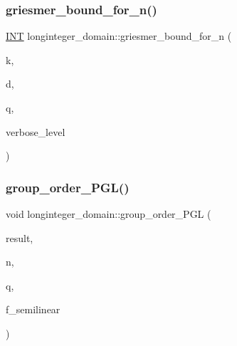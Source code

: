 \mbox{\label{classlonginteger__domain_af4d670e98c803dbce5433484af0e7b7d}} 
\subsubsection{\texorpdfstring{griesmer\+\_\+bound\+\_\+for\+\_\+n()}{griesmer\_bound\_for\_n()}}
{\footnotesize\ttfamily \mbox{\hyperlink{galois_8h_a09fddde158a3a20bd2dcadb609de11dc}{I\+NT}} longinteger\+\_\+domain\+::griesmer\+\_\+bound\+\_\+for\+\_\+n (\begin{DoxyParamCaption}\item[{\mbox{\hyperlink{galois_8h_a09fddde158a3a20bd2dcadb609de11dc}{I\+NT}}}]{k,  }\item[{\mbox{\hyperlink{galois_8h_a09fddde158a3a20bd2dcadb609de11dc}{I\+NT}}}]{d,  }\item[{\mbox{\hyperlink{galois_8h_a09fddde158a3a20bd2dcadb609de11dc}{I\+NT}}}]{q,  }\item[{\mbox{\hyperlink{galois_8h_a09fddde158a3a20bd2dcadb609de11dc}{I\+NT}}}]{verbose\+\_\+level }\end{DoxyParamCaption})}

\mbox{\label{classlonginteger__domain_a77d96b194e125185294157a70998edcc}} 
\subsubsection{\texorpdfstring{group\+\_\+order\+\_\+\+P\+G\+L()}{group\_order\_PGL()}}
{\footnotesize\ttfamily void longinteger\+\_\+domain\+::group\+\_\+order\+\_\+\+P\+GL (\begin{DoxyParamCaption}\item[{\mbox{\hyperlink{classlonginteger__object}{longinteger\+\_\+object}} \&}]{result,  }\item[{\mbox{\hyperlink{galois_8h_a09fddde158a3a20bd2dcadb609de11dc}{I\+NT}}}]{n,  }\item[{\mbox{\hyperlink{galois_8h_a09fddde158a3a20bd2dcadb609de11dc}{I\+NT}}}]{q,  }\item[{\mbox{\hyperlink{galois_8h_a09fddde158a3a20bd2dcadb609de11dc}{I\+NT}}}]{f\+\_\+semilinear }\end{DoxyParamCaption})}

